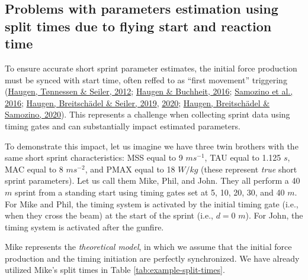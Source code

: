 \documentclass[fleqn,10pt]{wlpeerj} %
\begin{document}
\hypertarget{problems-with-parameters-estimation-using-split-times-due-to-flying-start-and-reaction-time}{%
\subsection{Problems with parameters estimation using split times due to flying start and reaction time}\label{problems-with-parameters-estimation-using-split-times-due-to-flying-start-and-reaction-time}}

To ensure accurate short sprint parameter estimates, the initial force production must be synced with start time, often reffed to as ``first movement'' triggering (\protect\hyperlink{ref-haugenDifferenceStartImpact2012}{Haugen, Tønnessen \& Seiler, 2012}; \protect\hyperlink{ref-haugenSprintRunningPerformance2016}{Haugen \& Buchheit, 2016}; \protect\hyperlink{ref-samozinoSimpleMethodMeasuring2016}{Samozino et al., 2016}; \protect\hyperlink{ref-haugenSprintMechanicalVariables2019}{Haugen, Breitschädel \& Seiler, 2019}, \protect\hyperlink{ref-haugenSprintMechanicalProperties2020}{2020}; \protect\hyperlink{ref-haugenPowerForceVelocityProfilingSprinting2020}{Haugen, Breitschädel \& Samozino, 2020}). This represents a challenge when collecting sprint data using timing gates and can substantially impact estimated parameters.

To demonstrate this impact, let us imagine we have three twin brothers with the same short sprint characteristics: MSS equal to 9 \(ms^{-1}\), TAU equal to 1.125 \(s\), MAC equal to 8 \(ms^{-2}\), and PMAX equal to 18 \(W/kg\) (these represent \emph{true} short sprint parameters). Let us call them Mike, Phil, and John. They all perform a 40 \(m\) sprint from a standing start using timing gates set at 5, 10, 20, 30, and 40 \(m\). For Mike and Phil, the timing system is activated by the initial timing gate (i.e., when they cross the beam) at the start of the sprint (i.e., \(d=0\) \(m\)). For John, the timing system is activated after the gunfire.

Mike represents the \emph{theoretical model}, in which we assume that the initial force production and the timing initiation are perfectly synchronized. We have already utilized Mike's split times in Table \ref{tab:example-split-times}.
\end{document}
